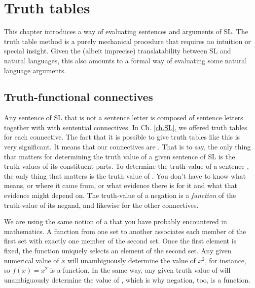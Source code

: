 \chapter{Truth tables}
\label{ch.TruthTables}

This chapter introduces a way of evaluating sentences and arguments of SL. The truth table method is a purely mechanical procedure that requires no intuition or special insight. Given the (albeit imprecise) translatability between SL and natural languages, this also amounts to a formal way of evaluating some natural language arguments.




\section{Truth-functional connectives}

Any sentence of SL that is not a sentence letter is composed of sentence letters together with with sentential connectives.
In Ch. \ref{ch.SL}, we offered truth tables for each connective.
The fact that it is possible to give truth tables like this is very significant.
It means that our connectives are .
That is to say, the only thing that matters for determining the truth value of a given sentence of SL is the truth values of its constituent parts.
To determine the truth value of a sentence \enot\metaA{}, the only thing that matters is the truth value of \metaA{}.
You don't have to know what \metaA{} means, or where it came from, or what evidence there is for it and what that evidence might depend on.
The truth-value of a negation is a \emph{function} of the truth-value of its negand, and likewise for the other connectives.

We are using the same notion of a  that you have probably encountered in mathematics.
A function from one set to another associates each member of the first set with exactly one member of the second set.
Once the first element is fixed, the function uniquely selects an element of the second set.
Any given numerical value of $x$ will unambiguously determine the value of $x^{2}$, for instance, so $f(x)=x^{2}$ is a function.
In the same way, any given truth value of \metaA{} will unambiguously determine the value of \enot\metaA{}, which is why negation, too, is a function.

